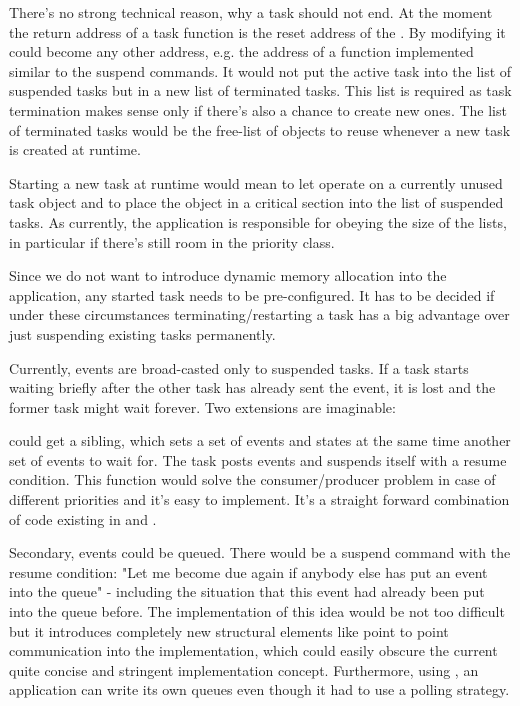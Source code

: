 There's no strong technical reason, why a task should not end. At the
moment the return address of a task function is the reset address of the
\uC{}. By modifying  it could become any other
address, e.g. the address of a function implemented similar to the suspend
commands. It would not put the active task into the list of suspended
tasks but in a new list of terminated tasks. This list is required as task
termination makes sense only if there's also a chance to create new ones.
The list of terminated tasks would be the free-list of objects to reuse
whenever a new task is created at runtime.

Starting a new task at runtime would mean to let 
operate on a currently unused task object and to place the object in a
critical section into the list of suspended tasks. As currently, the
application is responsible for obeying the size of the lists, in
particular if there's still room in the priority class.

Since we do not want to introduce dynamic memory allocation into the
application, any started task needs to be pre-configured. It has to be
decided if under these circumstances terminating/restarting a task has a
big advantage over just suspending existing tasks permanently.

Currently, events are broad-casted only to suspended tasks. If a task
starts waiting briefly after the other task has already sent the event, it
is lost and the former task might wait forever. Two extensions are
imaginable:

 could get a sibling, which sets a set of events and
states at the same time another set of events to wait for. The task posts
events and suspends itself with a resume condition. This function would
solve the consumer/producer problem in case of different priorities and
it's easy to implement. It's a straight forward combination of code
existing in  and .

Secondary, events could be queued. There would be a suspend command with
the resume condition: "Let me become due again if anybody else has put an
event into the queue" - including the situation that this event had
already been put into the queue before. The implementation of this idea
would be not too difficult but it introduces completely new structural
elements like point to point communication into the implementation, which
could easily obscure the current quite concise and stringent
implementation concept. Furthermore, using
, an \rtos{} application can write
its own queues even though it had to use a polling strategy.

